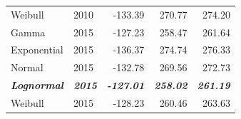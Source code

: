 \documentclass[
11pt, %
oneside, %
english, %
singlespacing, %
]{macthesis} %
\begin{document}
\begin{table}
\begin{tabular}{llrrr}
\hspace{1em}Weibull & 2010 & -133.39 & 270.77 & 274.20\\
\hspace{1em}Gamma & 2015 & -127.23 & 258.47 & 261.64\\
\hspace{1em}Exponential & 2015 & -136.37 & 274.74 & 276.33\\
\hspace{1em}Normal & 2015 & -132.78 & 269.56 & 272.73\\
\begingroup\fontsize{10}{12}\selectfont \em{\textbf{\hspace{1em}Lognormal}}\endgroup & \begingroup\fontsize{10}{12}\selectfont \em{\textbf{2015}}\endgroup & \begingroup\fontsize{10}{12}\selectfont \em{\textbf{-127.01}}\endgroup & \begingroup\fontsize{10}{12}\selectfont \em{\textbf{258.02}}\endgroup & \begingroup\fontsize{10}{12}\selectfont \em{\textbf{261.19}}\endgroup\\
\hspace{1em}Weibull & 2015 & -128.23 & 260.46 & 263.63\\
\bottomrule
\end{tabular}
\endgroup{}
\end{table}
\end{document}
